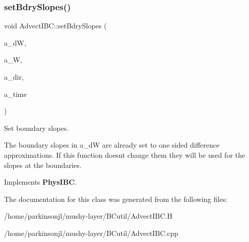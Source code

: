 \subsubsection{\texorpdfstring{set\+Bdry\+Slopes()}{setBdrySlopes()}}
{\footnotesize\ttfamily void Advect\+I\+B\+C\+::set\+Bdry\+Slopes (\begin{DoxyParamCaption}\item[{\textbf{ F\+Array\+Box} \&}]{a\+\_\+dW,  }\item[{const \textbf{ F\+Array\+Box} \&}]{a\+\_\+W,  }\item[{const int \&}]{a\+\_\+dir,  }\item[{const \textbf{ Real} \&}]{a\+\_\+time }\end{DoxyParamCaption})\hspace{0.3cm}{\ttfamily [virtual]}}



Set boundary slopes. 

The boundary slopes in a\+\_\+dW are already set to one sided difference approximations. If this function doesn\textquotesingle{}t change them they will be used for the slopes at the boundaries. 

Implements \textbf{ Phys\+I\+BC}.



The documentation for this class was generated from the following files\+:\begin{DoxyCompactItemize}
\item 
/home/parkinsonjl/mushy-\/layer/\+B\+Cutil/Advect\+I\+B\+C.\+H\item 
/home/parkinsonjl/mushy-\/layer/\+B\+Cutil/Advect\+I\+B\+C.\+cpp\end{DoxyCompactItemize}
